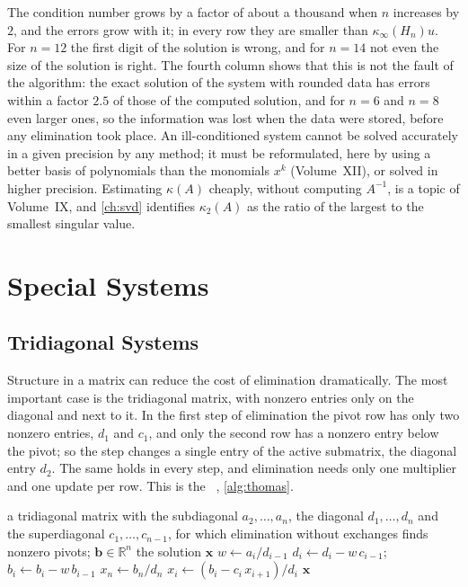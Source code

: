 The condition number grows by a factor of about a thousand when $n$ increases by $2$, and the errors grow with it; in every row they are smaller than $\kappa_\infty(H_n)u$. For $n=12$ the first digit of the solution is wrong, and for $n=14$ not even the size of the solution is right. The fourth column shows that this is not the fault of the algorithm: the exact solution of the system with rounded data has errors within a factor $2.5$ of those of the computed solution, and for $n=6$ and $n=8$ even larger ones, so the information was lost when the data were stored, before any elimination took place. An ill-conditioned system cannot be solved accurately in a given precision by any method; it must be reformulated, here by using a better basis of polynomials than the monomials $x^k$ (Volume~XII), or solved in higher precision. Estimating $\kappa(A)$ cheaply, without computing $A^{-1}$, is a topic of Volume~IX, and \cref{ch:svd} identifies $\kappa_2(A)$ as the ratio of the largest to the smallest singular value.

\section{Special Systems}
\label{sec:special-systems}

\subsection{Tridiagonal Systems}

Structure in a matrix can reduce the cost of elimination dramatically. The most important case is the tridiagonal matrix, with nonzero entries only on the diagonal and next to it. In the first step of elimination the pivot row has only two nonzero entries, $d_1$ and $c_1$, and only the second row has a nonzero entry below the pivot; so the step changes a single entry of the active submatrix, the diagonal entry $d_2$. The same holds in every step, and elimination needs only one multiplier and one update per row. This is the ~\cite{thomas1949}, \cref{alg:thomas}.

\begin{algorithm}
\begin{algorithmic}[1]
\Require a tridiagonal matrix with the subdiagonal $a_2,\ldots,a_n$, the diagonal $d_1,\ldots,d_n$ and the superdiagonal $c_1,\ldots,c_{n-1}$, for which elimination without exchanges finds nonzero pivots; $\mathbf b\in\mathbb R^n$
\Ensure the solution $\mathbf x$
  \State $w\gets a_i/d_{i-1}$ 
  \State $d_i\gets d_i-w\,c_{i-1}$; \ $b_i\gets b_i-w\,b_{i-1}$
\EndFor
\State $x_n\gets b_n/d_n$
  \State $x_i\gets(b_i-c_i\,x_{i+1})/d_i$
\EndFor
\State \Return $\mathbf x$
\end{algorithmic}
\caption{Gaussian elimination and back substitution for a tridiagonal system (the Thomas algorithm). The first loop uses five operations per row and the second three, $8n-7$ operations in all; the storage is four vectors of length $n$.}
\label{alg:thomas}
\end{algorithm}

